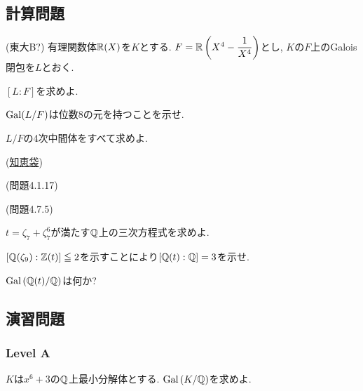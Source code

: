 \subsection{計算問題}




\begin{egprob} (東大B?)
有理関数体$\mathbb{R}(X)$を$K$とする. $F=\mathbb{R}\left( X^4 - \dfrac{1}{X^4} \right)$とし, $K$の$F$上のGalois閉包を$L$とおく.
\ben
\item $[L:F]$を求めよ.
\item $\mathrm{Gal}(L/F)$は位数8の元を持つことを示せ.
\item $L/F$の4次中間体をすべて求めよ.
\een
\end{egprob}
\begin{egans} (\href{https://detail.chiebukuro.yahoo.co.jp/qa/question_detail/q14198600154}{知恵袋})

\end{egans}










\begin{egprob} (\cite{aoyukie}問題4.1.17)

\end{egprob}
\begin{egprob} (\cite{aoyukie}問題4.7.5)
\ben
\item $t = \zeta_7 + \zeta_7^{6}$が満たす$\mathbb{Q}$上の三次方程式を求めよ.
\item $[\mathbb{Q}(\zeta_9): \mathbb{Z}(t)]\leqq 2$を示すことにより$[\mathbb{Q}(t):\mathbb{Q}] = 3$を示せ.
\item $\operatorname{Gal}{(\mathbb{Q}(t)/\mathbb{Q})}$は何か?
\een
\end{egprob}









\subsection{演習問題} %
\subsubsection{Level A}
\begin{prob}
$K$は$x^6+3$の$\mathbb{Q}$上最小分解体とする. $\operatorname{Gal}{(K/\mathbb{Q})}$を求めよ.
\end{prob}


